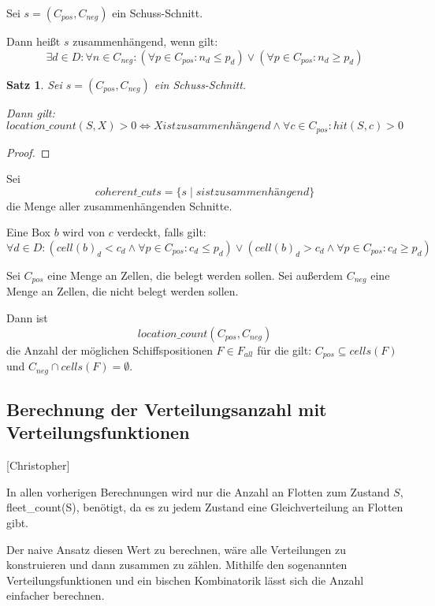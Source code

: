 \documentclass[a4paper,12pt]{llncs}
\numberwithin{equation}{section}
\newtheorem{satz}{Satz}
\begin{document}
\begin{definition}
Sei $s=(C_{pos}, C_{neg})$ ein Schuss-Schnitt.

Dann heißt $s$ zusammenhängend, wenn gilt:
\[
\exists d \in D \colon \forall n \in C_{neg} \colon (\forall p \in C_{pos} \colon n_d \leq p_d) \lor (\forall p \in C_{pos} \colon n_d \geq p_d)
\]
\end{definition}

\begin{satz}
Sei $s=(C_{pos}, C_{neg})$ ein Schuss-Schnitt.

Dann gilt:
\[
location\_count(S, X) > 0 \Leftrightarrow X ist zusammenhängend \land \forall c \in C_{pos} \colon hit(S,c) > 0
\]
\end{satz}

\begin{proof}
\end{proof}

\begin{definition}
Sei
\[
coherent\_cuts=\{s \mid s ist zusammenhängend\}
\]
die Menge aller zusammenhängenden Schnitte.
\end{definition}

\begin{definition}
Eine Box $b$ wird von $c$ verdeckt, falls gilt:
\[
\forall d \in D \colon (cell(b)_d < c_d \land \forall p \in C_{pos} \colon c_d \leq p_d) \lor (cell(b)_d > c_d \land \forall p \in C_{pos} \colon c_d \geq p_d)
\]

Sei $C_{pos}$ eine Menge an Zellen, die belegt werden sollen. Sei außerdem $C_{neg}$ eine Menge an Zellen, die nicht belegt werden sollen.

Dann ist
\[
location\_count(C_{pos}, C_{neg})
\]
die Anzahl der möglichen Schiffspositionen $F \in F_{all}$ für die gilt: $C_{pos} \subseteq cells(F)$ und $C_{neg} \cap cells(F) = \emptyset$.
\end{definition}

\subsection{Berechnung der Verteilungsanzahl mit Verteilungsfunktionen}[Christopher]

In allen vorherigen Berechnungen wird nur die Anzahl an Flotten zum Zustand $S$, fleet\_count(S), benötigt, da es zu jedem Zustand eine Gleichverteilung an Flotten gibt.

Der naive Ansatz diesen Wert zu berechnen, wäre alle Verteilungen zu konstruieren und dann zusammen zu zählen.
Mithilfe den sogenannten Verteilungsfunktionen und ein bischen Kombinatorik lässt sich die Anzahl einfacher berechnen.
\end{document}
